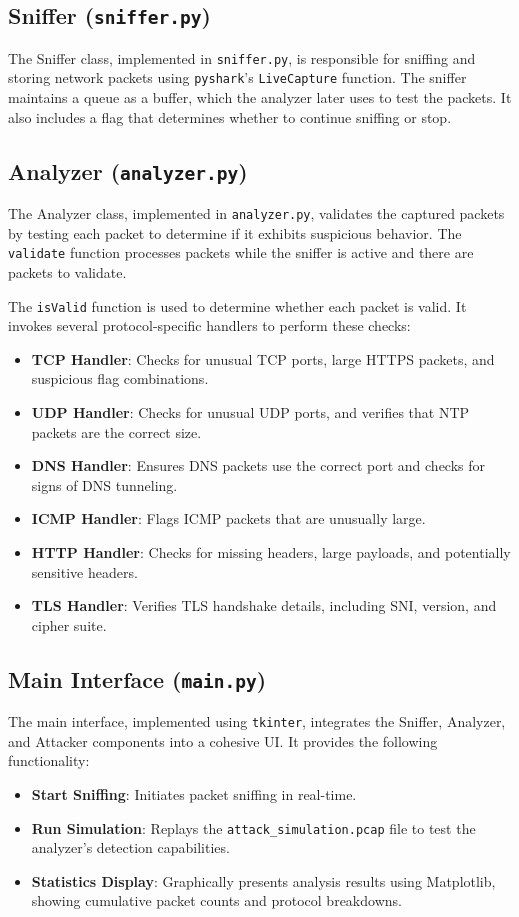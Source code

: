 \documentclass{article}
\begin{document}
\subsection{Sniffer (\texttt{sniffer.py})}
The Sniffer class, implemented in \texttt{sniffer.py}, is responsible for sniffing and storing network packets using \texttt{pyshark}'s \texttt{LiveCapture} function. The sniffer maintains a queue as a buffer, which the analyzer later uses to test the packets. It also includes a flag that determines whether to continue sniffing or stop.

\subsection{Analyzer (\texttt{analyzer.py})}
The Analyzer class, implemented in \texttt{analyzer.py}, validates the captured packets by testing each packet to determine if it exhibits suspicious behavior. The \texttt{validate} function processes packets while the sniffer is active and there are packets to validate.

The \texttt{isValid} function is used to determine whether each packet is valid. It invokes several protocol-specific handlers to perform these checks:
\begin{itemize}
    \item \textbf{TCP Handler}: Checks for unusual TCP ports, large HTTPS packets, and suspicious flag combinations.
    \item \textbf{UDP Handler}: Checks for unusual UDP ports, and verifies that NTP packets are the correct size.
    \item \textbf{DNS Handler}: Ensures DNS packets use the correct port and checks for signs of DNS tunneling.
    \item \textbf{ICMP Handler}: Flags ICMP packets that are unusually large.
    \item \textbf{HTTP Handler}: Checks for missing headers, large payloads, and potentially sensitive headers.
    \item \textbf{TLS Handler}: Verifies TLS handshake details, including SNI, version, and cipher suite.
\end{itemize}

\subsection{Main Interface (\texttt{main.py})}
The main interface, implemented using \texttt{tkinter}, integrates the Sniffer, Analyzer, and Attacker components into a cohesive UI. It provides the following functionality:
\begin{itemize}
    \item \textbf{Start Sniffing}: Initiates packet sniffing in real-time.
    \item \textbf{Run Simulation}: Replays the \texttt{attack\_simulation.pcap} file to test the analyzer's detection capabilities.
    \item \textbf{Statistics Display}: Graphically presents analysis results using Matplotlib, showing cumulative packet counts and protocol breakdowns.
\end{itemize}
\end{document}

